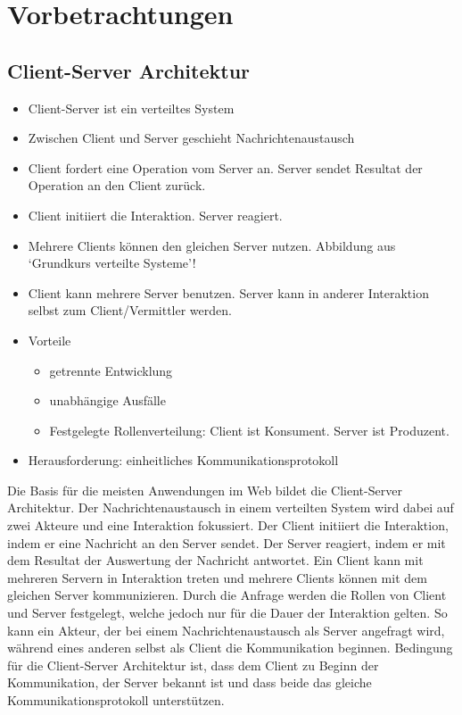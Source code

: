 \chapter{Vorbetrachtungen}
\section{Client-Server Architektur}
\begin{itemize}
  \item Client-Server ist ein verteiltes System
  \item Zwischen Client und Server geschieht Nachrichtenaustausch
  \item Client fordert eine Operation vom Server an. Server sendet Resultat der Operation an den Client zurück.
  \item Client initiiert die Interaktion. Server reagiert.
  \item Mehrere Clients können den gleichen Server nutzen. Abbildung aus `Grundkurs verteilte Systeme'!
  \item Client kann mehrere Server benutzen. Server kann in anderer Interaktion selbst zum Client/Vermittler werden.
  \item Vorteile
    \begin{itemize}
      \item getrennte Entwicklung
      \item unabhängige Ausfälle
      \item Festgelegte Rollenverteilung: Client ist Konsument. Server ist Produzent.
    \end{itemize}
  \item Herausforderung: einheitliches Kommunikationsprotokoll
\end{itemize}
Die Basis für die meisten Anwendungen im Web bildet die Client-Server Architektur.
Der Nachrichtenaustausch in einem verteilten System wird dabei auf zwei Akteure und eine Interaktion fokussiert.
Der Client initiiert die Interaktion, indem er eine Nachricht an den Server sendet.
Der Server reagiert, indem er mit dem Resultat der Auswertung der Nachricht antwortet.
Ein Client kann mit mehreren Servern in Interaktion treten und mehrere Clients können mit dem gleichen Server kommunizieren.
Durch die Anfrage werden die Rollen von Client und Server festgelegt, welche jedoch nur für die Dauer der Interaktion gelten.
So kann ein Akteur, der bei einem Nachrichtenaustausch als Server angefragt wird, während eines anderen selbst als Client die Kommunikation beginnen.
Bedingung für die Client-Server Architektur ist, dass dem Client zu Beginn der Kommunikation, der Server bekannt ist und dass beide das gleiche Kommunikationsprotokoll unterstützen.
